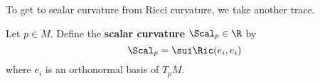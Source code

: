 To get to scalar curvature from Ricci curvature, we take another trace.
\begin{df}
Let $p\in M$. Define the \textbf{scalar curvature} $\Scal_p\in \R$ by
\[
\Scal_p=\sui \Ric(e_i,e_i)
\]
where $e_i$ is an orthonormal basis of $T_pM$.
\end{df}
%
%
%
